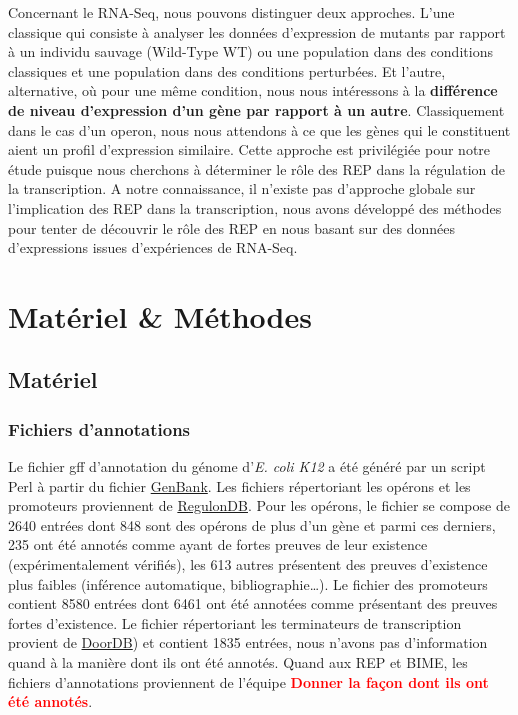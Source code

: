 \documentclass[12pt,a4paper]{report}
\begin{document}
\begin{onehalfspace}
Concernant le RNA-Seq, nous pouvons distinguer deux approches. L'une classique qui consiste à analyser les données d'expression de mutants par rapport à un individu sauvage (Wild-Type WT) ou une population dans des conditions classiques et une population dans des conditions perturbées. Et l'autre, alternative, où pour une même condition, nous nous intéressons à la \textbf{différence de niveau d'expression d'un gène par rapport à un autre}. Classiquement dans le cas d'un \gls{operon}, nous nous attendons à ce que les gènes qui le constituent aient un profil d'expression similaire. Cette approche est privilégiée pour notre étude puisque nous cherchons à déterminer le rôle des REP dans la régulation de la transcription.
A notre connaissance, il n'existe pas d'approche globale sur l'implication des REP dans la transcription, nous avons développé des méthodes pour tenter de découvrir le rôle des REP en nous basant sur des données d'expressions issues d'expériences de RNA-Seq.


\chapter*{Matériel \& Méthodes}

\section*{Matériel}

\subsection*{Fichiers d'annotations}
Le fichier \gls{gff} d'annotation du génome d'\textit{E. coli K12} a été généré par un script Perl à partir du fichier \href{http://www.ncbi.nlm.nih.gov/nuccore/NC_000913.2}{GenBank}. Les fichiers répertoriant les opérons et les promoteurs proviennent de \href{http://regulondb.ccg.unam.mx/}{RegulonDB}. Pour les opérons, le fichier se compose de 2640 entrées dont 848 sont des opérons de plus d'un gène et parmi ces derniers, 235 ont été annotés comme ayant de fortes preuves de leur existence (expérimentalement vérifiés), les 613 autres présentent des preuves d'existence plus faibles (inférence automatique, bibliographie\ldots). Le fichier des promoteurs contient 8580 entrées dont 6461 ont été annotées comme présentant des preuves fortes d'existence. Le fichier répertoriant les terminateurs de transcription provient de \href{http://csbl.bmb.uga.edu/DOOR/}{DoorDB}) et contient 1835 entrées, nous n'avons pas d'information quand à la manière dont ils ont été annotés. Quand aux REP et BIME, les fichiers d'annotations proviennent de l'équipe \textcolor{red}{\textbf{Donner la façon dont ils ont été annotés}}.


\end{onehalfspace}
\end{document}
